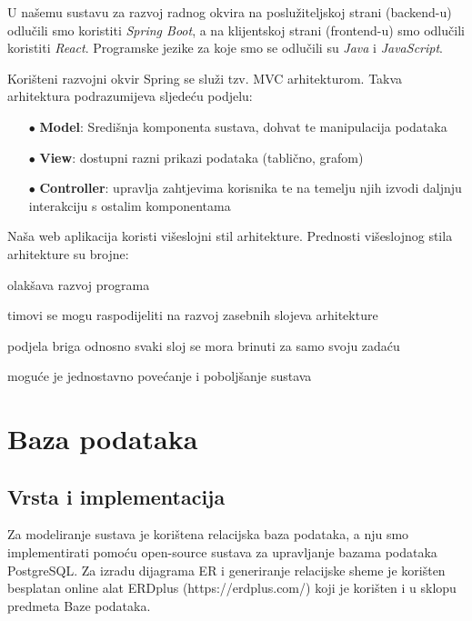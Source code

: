 		
		U našemu sustavu za razvoj radnog okvira na poslužiteljskoj strani (backend-u) odlučili smo koristiti \textit {Spring Boot}, a na klijentskoj strani (frontend-u) smo odlučili koristiti \textit {React}. Programske jezike za koje smo se odlučili su \textit {Java} i \textit {JavaScript}.
		
		
		Korišteni razvojni okvir Spring se služi tzv. MVC arhitekturom. Takva arhitektura podrazumijeva sljedeću podjelu:
		\begin{itemize}
			\item[$\bullet$] \textbf{Model}: Središnja komponenta sustava, dohvat te manipulacija podataka
			\item[$\bullet$] \textbf{View}: dostupni razni prikazi podataka (tablično, grafom)
			\item[$\bullet$] \textbf{Controller}: upravlja zahtjevima korisnika te na temelju njih izvodi daljnju interakciju s ostalim komponentama
		\end{itemize}
		
		\vspace{3cm}
		
		Naša web aplikacija koristi višeslojni stil arhitekture. Prednosti višeslojnog stila arhitekture su brojne:
		
		\begin{packed_item}
			\item[$\bullet$] olakšava razvoj programa
			\item[$\bullet$] timovi se mogu raspodijeliti na razvoj zasebnih slojeva arhitekture
			\item[$\bullet$] podjela briga odnosno svaki sloj se mora brinuti za samo svoju zadaću
			\item[$\bullet$] moguće je jednostavno povećanje i poboljšanje sustava
		\end{packed_item}

	
		

		

				
		\section{Baza podataka}
			
			
		
		
		\subsection{Vrsta i implementacija}
		Za modeliranje sustava je korištena relacijska baza podataka, a nju smo implementirati pomoću open-source sustava za upravljanje bazama podataka PostgreSQL. Za izradu dijagrama ER i generiranje relacijske sheme je korišten besplatan online alat ERDplus (https://erdplus.com/) koji je korišten i u sklopu predmeta Baze podataka. 
		
